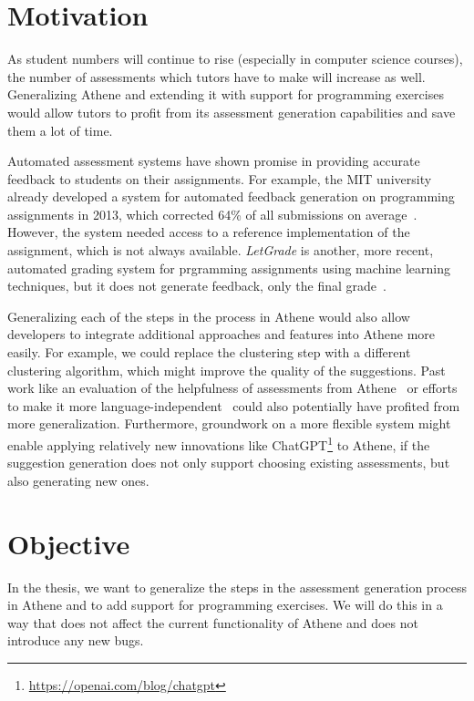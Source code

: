 \section{Motivation}

As student numbers will continue to rise (especially in computer science courses), the number of assessments which tutors have to make will increase as well.
Generalizing Athene and extending it with support for programming exercises would allow tutors to profit from its assessment generation capabilities and save them a lot of time.

Automated assessment systems have shown promise in providing accurate feedback to students on their assignments.
For example, the MIT university already developed a system for automated feedback generation on programming assignments in 2013, which corrected 64\% of all submissions on average~\cite{singh2013automated}. However, the system needed access to a reference implementation of the assignment, which is not always available. 
\textit{LetGrade} is another, more recent, automated grading system for prgramming assignments using machine learning techniques, but it does not generate feedback, only the final grade~\cite{messer2022grading}.

Generalizing each of the steps in the process in Athene would also allow developers to integrate additional approaches and features into Athene more easily.
For example, we could replace the clustering step with a different clustering algorithm, which might improve the quality of the suggestions. Past work like an evaluation of the helpfulness of assessments from Athene~\cite{atheneTracking} or efforts to make it more language-independent~\cite{atheneLanguage} could also potentially have profited from more generalization.
%
Furthermore, groundwork on a more flexible system might enable applying relatively new innovations like ChatGPT\footnote{\url{https://openai.com/blog/chatgpt}} to Athene, if the suggestion generation does not only support choosing existing assessments, but also generating new ones.

\section{Objective}
In the thesis, we want to generalize the steps in the assessment generation process in Athene and to add support for programming exercises. We will do this in a way that does not affect the current functionality of Athene and does not introduce any new bugs.

